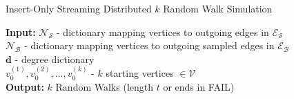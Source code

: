 \documentclass{report}
\newcommand{\algoname}[1]{\textnormal{\textsc{#1}}}
\begin{document}
\begin{algorithm}[htbp] 
\caption{Insert-Only Streaming Distributed $k$ Random Walk Simulation}\label{alg:rw:distributed:insert-only:simulation}
\begin{flushleft}
        \textbf{Input:} 		$\mathcal{N}_\mathcal{S}$ - dictionary mapping vertices to outgoing edges in $\mathcal{E}_\mathcal{S}$ \\
        	\hspace{3.15em}	$\mathcal{N}_\mathcal{B}$ - dictionary mapping vertices to outgoing sampled edges in $\mathcal{E}_\mathcal{B}$ \\
        	\hspace{3.15em}	$\mathbf{d}$ - degree dictionary \\
        	\hspace{3.15em}	$v_0^{(1)}, v_0^{(2)}, \dots, v_0^{(k)}$ - $k$ starting vertices $\in \mathcal{V}$ \\
        \textbf{Output:} $k$ Random Walks (length $t$ or ends in FAIL)
\end{flushleft}
\begin{flushleft}
\begin{algorithmic}[1]

\end{algorithmic}
\end{flushleft}
\end{algorithm}
\end{document}
